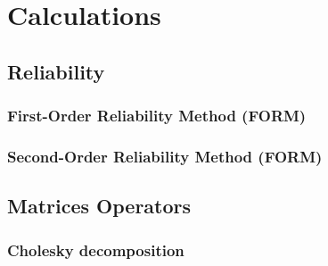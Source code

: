 \documentclass[letterpaper,10pt,english]{sphinxmanual}
\begin{document}

\begin{fulllineitems}
\label{model:pyre.model.StochasticModel}
\end{fulllineitems}



\chapter{Calculations}
\label{calculations:chap-calculations}\label{calculations::doc}\label{calculations:calculations}

\section{Reliability}
\label{calculations:reliability}

\subsection{First-Order Reliability Method (FORM)}
\label{calculations:first-order-reliability-method-form}\label{calculations:module-pyre.form}

\begin{fulllineitems}
\label{calculations:pyre.form.Form}
\end{fulllineitems}

\label{calculations:module-pyre.limitstate}\label{calculations:module-pyre.stepsize}

\subsection{Second-Order Reliability Method (FORM)}
\label{calculations:second-order-reliability-method-form}

\section{Matrices Operators}
\label{calculations:matrices-operators}

\subsection{Cholesky decomposition}
\label{calculations:cholesky-decomposition}\label{calculations:module-pyre.cholesky}
\end{document}

